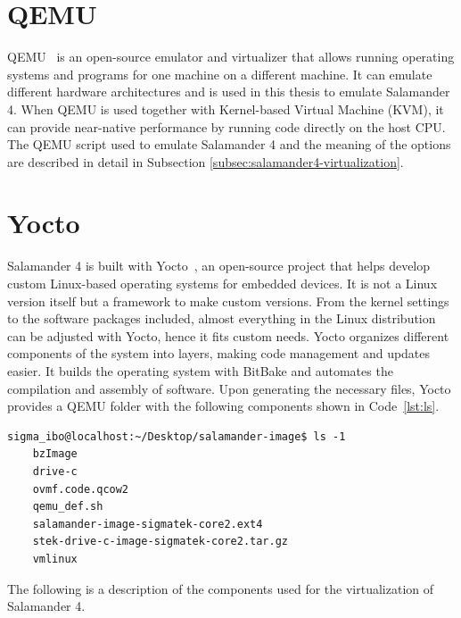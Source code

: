 \documentclass[MMR,Master,english]{style/twbook}
\begin{document}
\clearpage

\section{QEMU}\label{sec:qemu}

QEMU~\cite{QEMU} is an open-source emulator and virtualizer that allows running operating systems and programs for one machine on a different machine. It can emulate different hardware architectures and is used in this thesis to emulate Salamander 4. When QEMU is used together with Kernel-based Virtual Machine (KVM), it can provide near-native performance by running code directly on the host CPU. The QEMU script used to emulate Salamander 4 and the meaning of the options are described in detail in Subsection \ref{subsec:salamander4-virtualization}.

\section{Yocto}\label{sec:yocto}

Salamander 4 is built with Yocto~\cite{WelcomeYoctoProject}, an open-source project that helps develop custom Linux-based operating systems for embedded devices. It is not a Linux version itself but a framework to make custom versions. From the kernel settings to the software packages included, almost everything in the Linux distribution can be adjusted with Yocto, hence it fits custom needs. Yocto organizes different components of the system into layers, making code management and updates easier. It builds the operating system with BitBake and automates the compilation and assembly of software. Upon generating the necessary files, Yocto provides a QEMU folder with the following components shown in Code~\ref{lst:ls}.

\vspace{2em}
\begin{lstlisting}[name={Contents of QEMU Folder for Salamander 4},label={lst:ls}]
    sigma_ibo@localhost:~/Desktop/salamander-image$ ls -1
    bzImage
    drive-c
    ovmf.code.qcow2
    qemu_def.sh
    salamander-image-sigmatek-core2.ext4
    stek-drive-c-image-sigmatek-core2.tar.gz
    vmlinux
    \end{lstlisting}

\noindent The following is a description of the components used for the virtualization of Salamander 4.
\end{document}

